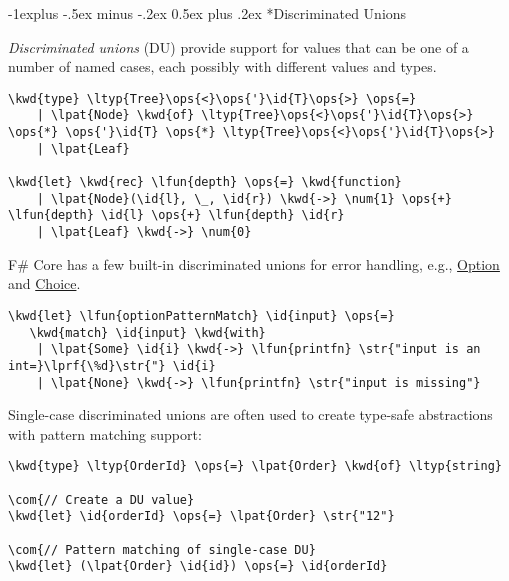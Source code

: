 \documentclass[10pt,landscape]{article}
\makeatletter
\renewcommand{\subsection}{\@startsection{subsection}{2}{0mm}%
                                {-1explus -.5ex minus -.2ex}%
                                {0.5ex plus .2ex}%
                                {\normalfont\normalsize\bfseries}}
\newcommand{\id}[1]{\textcolor[HTML]{000000}{#1}}
\newcommand{\str}[1]{\textcolor[HTML]{A31515}{#1}}
\newcommand{\kwd}[1]{\textcolor[HTML]{0000FF}{#1}}
\newcommand{\com}[1]{\textcolor[HTML]{008000}{#1}}
\newcommand{\ops}[1]{\textcolor[HTML]{000000}{#1}}
\newcommand{\num}[1]{\textcolor[HTML]{000000}{#1}}
\newcommand{\ltyp}[1]{\textcolor[HTML]{2B91AF}{#1}}
\newcommand{\lfun}[1]{\textcolor[HTML]{0000A0}{#1}}
\newcommand{\lpat}[1]{\textcolor[HTML]{800080}{#1}}
\newcommand{\lprf}[1]{\textcolor[HTML]{2B91AF}{#1}}
\makeatother
\begin{document}
\begin{multicols}{3}
\begin{Verbatim}[commandchars=\\\{\}]
\end{Verbatim}

\subsection*{Discriminated Unions}



\emph{Discriminated unions} (DU) provide support for values that can be one of a number of named cases, each possibly with different values and types.
\begin{Verbatim}[commandchars=\\\{\}]
\kwd{type} \ltyp{Tree}\ops{<}\ops{'}\id{T}\ops{>} \ops{=}
    | \lpat{Node} \kwd{of} \ltyp{Tree}\ops{<}\ops{'}\id{T}\ops{>} \ops{*} \ops{'}\id{T} \ops{*} \ltyp{Tree}\ops{<}\ops{'}\id{T}\ops{>}
    | \lpat{Leaf}

\kwd{let} \kwd{rec} \lfun{depth} \ops{=} \kwd{function}
    | \lpat{Node}(\id{l}, \_, \id{r}) \kwd{->} \num{1} \ops{+} \lfun{depth} \id{l} \ops{+} \lfun{depth} \id{r}
    | \lpat{Leaf} \kwd{->} \num{0}

\end{Verbatim}



F\# Core has a few built-in discriminated unions for error handling, e.g., \href{http://msdn.microsoft.com/en-us/library/dd233245.aspx}{Option} and \href{http://msdn.microsoft.com/en-us/library/ee353439.aspx}{Choice}.
\begin{Verbatim}[commandchars=\\\{\}]
\kwd{let} \lfun{optionPatternMatch} \id{input} \ops{=}
   \kwd{match} \id{input} \kwd{with}
    | \lpat{Some} \id{i} \kwd{->} \lfun{printfn} \str{"input is an int=}\lprf{\%d}\str{"} \id{i}
    | \lpat{None} \kwd{->} \lfun{printfn} \str{"input is missing"}

\end{Verbatim}



Single-case discriminated unions are often used to create type-safe abstractions with pattern matching support:
\begin{Verbatim}[commandchars=\\\{\}]
\kwd{type} \ltyp{OrderId} \ops{=} \lpat{Order} \kwd{of} \ltyp{string}

\com{// Create a DU value}
\kwd{let} \id{orderId} \ops{=} \lpat{Order} \str{"12"}

\com{// Pattern matching of single-case DU}
\kwd{let} (\lpat{Order} \id{id}) \ops{=} \id{orderId}


\end{Verbatim}
\end{multicols}
\end{document}

